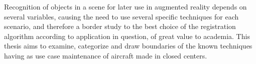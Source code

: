 Recognition of objects in a scene for later use in augmented reality depends on several variables, causing the need to use several specific techniques for each scenario, and therefore a border study to the best choice of the registration algorithm according to application in question, of great value to academia.
This thesis aims to examine, categorize and draw boundaries of the known techniques having as use case maintenance of aircraft made in closed centers.